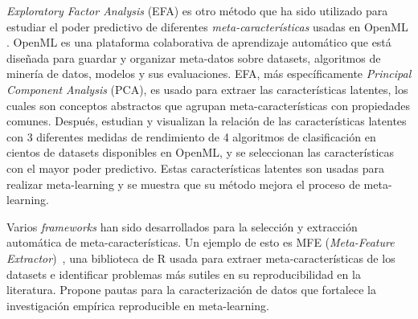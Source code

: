 \textit{Exploratory Factor Analysis} (EFA) es otro método que ha sido utilizado para estudiar el poder predictivo de diferentes \textit{meta-características} usadas en OpenML \cite{bilalli2017predictive}. OpenML es una plataforma colaborativa de aprendizaje automático que está diseñada para guardar y organizar meta-datos sobre datasets, algoritmos de minería de datos, modelos y sus evaluaciones. EFA, más específicamente \textit{Principal Component Analysis} (PCA),  es usado para extraer las características latentes, los cuales son conceptos abstractos que agrupan meta-características con propiedades comunes. Después, estudian y visualizan la relación de las características latentes con 3 diferentes medidas de rendimiento de 4 algoritmos de clasificación en cientos de datasets disponibles en OpenML, y se seleccionan las características con el mayor poder predictivo. Estas características latentes son usadas para realizar meta-learning y se muestra que su método mejora el proceso de meta-learning.

Varios \textit{frameworks} han sido desarrollados para la selección y extracción automática de meta-características. Un ejemplo de esto es MFE (\textit{Meta-Feature Extractor})~\cite{Rivolli2018TowardsRE}, una biblioteca de R usada para extraer meta-características de los datasets e identificar problemas más sutiles en su reproducibilidad en la literatura. Propone pautas para la caracterización de datos que fortalece la investigación empírica reproducible en meta-learning.


%

